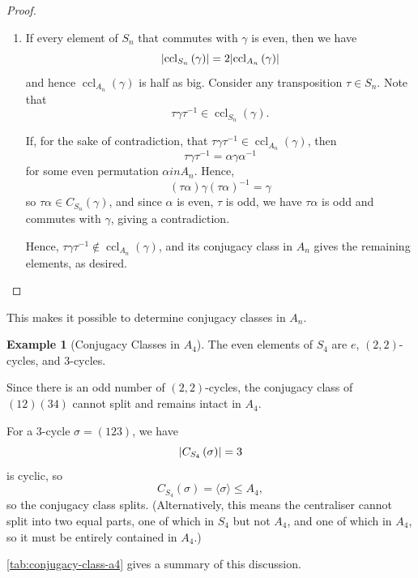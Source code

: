\documentclass{article}
\theoremstyle{definition}
\newtheorem*{example*}{Example}
\theoremstyle{remark}
\DeclarePairedDelimiter{\abs}{\lvert}{\rvert}
\newcommand{\pqty}[1]{\left(#1\right)}
\newcommand{\angBrac}[1]{\langle #1\rangle}
\newcommand{\perm}[1]{(#1)}
\newcommand{\inverse}{^{-1}}
\newcommand{\subgroup}{\leq}
\newcommand{\ccl}{\operatorname{ccl}}
\begin{document}
\begin{proof}
\begin{enumerate}
        \item If every element of \(S_n\) that commutes with \(\gamma\) is even, then we have
        \[
            \abs{\ccl_{S_n} \pqty{\gamma}} = 2 \abs{\ccl_{A_n} \pqty{\gamma}}
        \]
        and hence \(\ccl_{A_n} \pqty{\gamma}\) is half as big. Consider any transposition \(\tau \in S_n\). Note that
        \[
            \tau \gamma \tau\inverse \in \ccl_{S_n} \pqty{\gamma}.
        \]

        If, for the sake of contradiction, that \(\tau \gamma \tau\inverse \in \ccl_{A_n}\pqty{\gamma}\), then
        \[
            \tau \gamma \tau\inverse = \alpha \gamma \alpha\inverse
        \]
        for some even permutation \(\alpha in A_n\). Hence,
        \[
            \pqty{\tau \alpha} \gamma \pqty{\tau \alpha}\inverse = \gamma
        \]
        so \(\tau \alpha \in C_{S_n} \pqty{\gamma}\), and since \(\alpha\) is even, \(\tau\) is odd, we have \(\tau \alpha\) is odd and commutes with \(\gamma\), giving a contradiction.

        Hence, \(\tau \gamma \tau\inverse \notin \ccl_{A_n} \pqty{\gamma}\), and its conjugacy class in \(A_n\) gives the remaining elements, as desired.
    \end{enumerate}
\end{proof}

This makes it possible to determine conjugacy classes in \(A_n\).

\begin{example*}[Conjugacy Classes in \(A_4\)]
    The even elements of \(S_4\) are \(e\), \(\pqty{2, 2}\)-cycles, and \(3\)-cycles.

    Since there is an odd number of \(\pqty{2, 2}\)-cycles, the conjugacy class of \(\perm{12}\perm{34}\) cannot split and remains intact in \(A_4\).

    For a \(3\)-cycle \(\sigma = \perm{123}\), we have
    \[
        \abs{C_{S_4} \pqty{\sigma}} = 3
    \]
    is cyclic, so
    \[
        C_{S_4} \pqty{\sigma} = \angBrac{\sigma} \subgroup A_4,
    \]
    so the conjugacy class splits. (Alternatively, this means the centraliser cannot split into two equal parts, one of which in \(S_4\) but not \(A_4\), and one of which in \(A_4\), so it must be entirely contained in \(A_4\).)

    \autoref{tab:conjugacy-class-a4} gives a summary of this discussion.
\end{example*}
\end{document}
